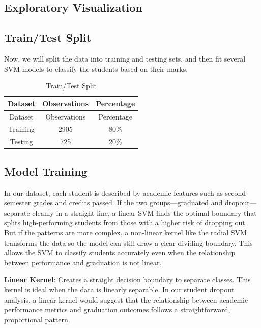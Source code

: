 \documentclass[
]{article}
\begin{document}
\subsection{Exploratory Visualization}\label{exploratory-visualization}

\subsection{Train/Test Split}\label{traintest-split-1}

Now, we will split the data into training and testing sets, and then fit
several SVM models to classify the students based on their marks.

\begin{longtable}[]{@{}ccc@{}}
\caption{Train/Test Split}\tabularnewline
\toprule\noalign{}
Dataset & Observations & Percentage \\
\midrule\noalign{}
\endfirsthead
\toprule\noalign{}
Dataset & Observations & Percentage \\
\midrule\noalign{}
\endhead
\bottomrule\noalign{}
\endlastfoot
Training & 2905 & 80\% \\
Testing & 725 & 20\% \\
\end{longtable}

\subsection{Model Training}\label{model-training-1}

In our dataset, each student is described by academic features such as
second-semester grades and credits passed. If the two groups---graduated
and dropout--- separate cleanly in a straight line, a linear SVM finds
the optimal boundary that splits high-performing students from those
with a higher risk of dropping out. But if the patterns are more
complex, a non-linear kernel like the radial SVM transforms the data so
the model can still draw a clear dividing boundary. This allows the SVM
to classify students accurately even when the relationship between
performance and graduation is not linear.

\textbf{Linear Kernel}: Creates a straight decision boundary to separate
classes. This kernel is ideal when the data is linearly separable. In
our student dropout analysis, a linear kernel would suggest that the
relationship between academic performance metrics and graduation
outcomes follows a straightforward, proportional pattern.
\end{document}
